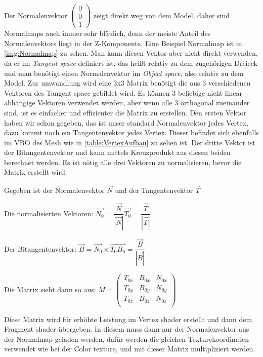 Der Normalenvektor $\begin{pmatrix}
	0 \\ 0 \\ 1
\end{pmatrix}$ zeigt direkt weg von dem Model, daher sind Normalmaps auch immer sehr bläulich, denn der meiste Anteil des Normalenvektors liegt in der Z-Komponente. Eine Beispiel Normalmap ist in \cref{img:Normalmap} zu sehen. Man kann diesen Vektor aber nicht direkt verwenden, da er im \textit{Tangent space} definiert ist, das heißt relativ zu dem zugehörigen Dreieck und man benötigt einen Normalenvektor im \textit{Object space}, also relativ zu dem Model. Zur umwandlung wird eine 3x3 Matrix benötigt die aus 3 verschiedenen Vektoren des Tangent space gebildet wird. Es können 3 beliebige nicht linear abhängige Vektoren verwendet werden, aber wenn alle 3 orthogonal zueinander sind, ist es einfacher und effizienter die Matrix zu erstellen. Den ersten Vektor haben wir schon gegeben, das ist unser standard Normalenvektor jedes Vertex, dazu kommt noch ein Tangentenvektor jedes Vertex. Dieser befindet sich ebenfalls im VBO des Mesh wie in \cref{table:VertexAufbau} zu sehen ist. Der dritte Vektor ist der Bitangentenvektor und kann mittels Kreuzprodukt aus diesen beiden berechnet werden. Es ist nötig alle drei Vektoren zu normalisieren, bevor die Matrix erstellt wird.

Gegeben ist der Normalenvektor $\overrightarrow{N}$ und der Tangentenvektor $\overrightarrow{T}$

Die normalisierten Vektoren: $\overrightarrow{N_{0}} = \dfrac{\overrightarrow{N}}{|\overrightarrow{N}|}$\qquad	$\overrightarrow{T_{0}} = \dfrac{\overrightarrow{T}}{|\overrightarrow{T}|}$

Der Bitangentenvektor: $\overrightarrow{B} = \overrightarrow{N_{0}} \times \overrightarrow{T_{0}}$\qquad	$\overrightarrow{B_{0}} = \dfrac{\overrightarrow{B}}{|\overrightarrow{B}|}$

Die Matrix sieht dann so aus: $M =  \begin{pmatrix}
T_{0x} & B_{0x} & N_{0x} \\
T_{0y} & B_{0y} & N_{0y} \\
T_{0z} & B_{0z} & N_{0z} \\
\end{pmatrix}$

Diese Matrix wird für erhöhte Leistung im Vertex shader erstellt und dann dem Fragment shader übergeben. In diesem muss dann nur der Normalenvektor aus der Normalmap geladen werden, dafür werden die gleichen Texturekoordinaten verwendet wie bei der Color texture, und mit dieser Matrix multipliziert werden.

